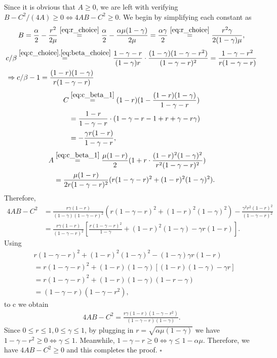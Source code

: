 \documentclass{article}
\theoremstyle{plain}
\theoremstyle{definition}
\theoremstyle{remark}
\begin{document}
Since it is obvious that $A\ge 0$, we are left with verifying $B-C^2/(4A) \ge 0 \Leftrightarrow 4AB-C^2 \ge 0$. We begin by simplifying each constant as
\begin{equation}
    B = \frac{\alpha}{2} - \frac{r^2}{2\mu} \stackrel{\eqref{eq:r_choice}}{=}\frac{\alpha}{2} - \frac{\alpha \mu(1-\gamma)}{2\mu} = \frac{\alpha\gamma}{2} \stackrel{\eqref{eq:r_choice}}{=} \frac{r^2 \gamma}{2(1-\gamma)\mu},
\end{equation}
\begin{align}
    &c/\beta \stackrel{\eqref{eq:c_choice},\eqref{eq:beta_choice}}{=}\frac{1-\gamma-r}{(1-\gamma)r} \cdot \frac{(1-\gamma)(1-\gamma-r^2)}{(1-\gamma-r)^2} = \frac{1-\gamma-r^2}{r(1-\gamma-r)} \\
    &\Rightarrow c/\beta - 1 = \frac{(1-r)(1-\gamma)}{r(1-\gamma-r)} \label{eq:c_beta_1}
\end{align}
\begin{align}
    C &\stackrel{\eqref{eq:c_beta_1}}{=}(1-r)(1 -\frac{(1-r)(1-\gamma)}{1-\gamma-r}) \\
    &= \frac{1-r}{1-\gamma - r} \cdot (1-\gamma -r -1 + r + \gamma - r\gamma)\\
    &= - \frac{\gamma r(1-r)}{1-\gamma - r} ,
\end{align}
\begin{align}
A &\stackrel{\eqref{eq:c_beta_1}}{=} \frac{\mu(1-r)}{2} (1 + r\cdot \frac{(1-r)^2(1-\gamma)^2}{r^2 (1-\gamma-r)^2}) \\
&= \frac{\mu(1-r)}{2r (1-\gamma-r)^2} (r (1-\gamma-r)^2 + (1-r)^2(1-\gamma)^2).
\end{align}
Therefore,
\begin{align}
    4AB-C^2 &= \frac{r \gamma (1-r)}{(1-\gamma) (1-\gamma-r)^2} (r (1-\gamma-r)^2 + (1-r)^2(1-\gamma)^2) - \frac{\gamma^2 r^2 (1-r)^2}{(1-\gamma-r)^2}  \\
    &=\frac{r\gamma(1-r)}{(1-\gamma-r)^2}\left[ \frac{r (1-\gamma-r)^2}{1-\gamma} + (1-r)^2(1-\gamma) - \gamma r (1-r) \right].
\end{align}
Using
\begin{align}
    &r (1-\gamma-r)^2 + (1-r)^2(1-\gamma)^2 - (1-\gamma)\gamma r (1-r) \\
    &= r (1-\gamma-r)^2 + (1-r) (1-\gamma)[(1-r)(1-\gamma) - \gamma r] \\
    &= r(1-\gamma -r)^2 + (1-r)(1-\gamma)(1-r-\gamma) \\
    &= (1-\gamma-r)(1-\gamma - r^2),
\end{align}to c
we obtain
\begin{align}
    4AB-C^2 = \frac{r\gamma(1-r)(1-\gamma-r^2)}{(1-\gamma-r)(1-\gamma)}.
\end{align}
    Since $0\leq r \leq 1, 0 \leq \gamma \leq 1$, by plugging in $r = \sqrt{\alpha \mu (1-\gamma) }$ we have $1-\gamma -r^2 \ge 0  \Leftrightarrow \gamma \leq 1$. Meanwhile, $1-\gamma - r \ge0 \Leftrightarrow \gamma \leq 1- \alpha \mu$. Therefore, we have $4AB - C^2 \ge 0$ and this completes the proof.
\hfill $\square$
\end{document}
